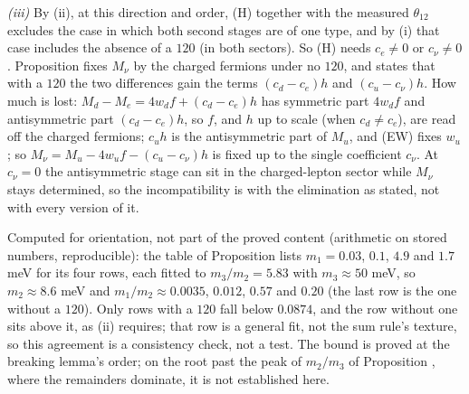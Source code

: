 \emph{(iii)} By (ii), at this direction and order, (H) together with the measured $\theta_{12}$ excludes the case in which both second stages are of one type, and by (i) that case includes the absence of a $120$ (in both sectors). So (H) needs $c_{e} \neq 0$ or $c_{\nu} \neq 0$. Proposition  fixes $M_{\nu}$ by the charged fermions under no $120$, and states that with a $120$ the two differences gain the terms $(c_{d} - c_{e})h$ and $(c_{u} - c_{\nu})h$. How much is lost: $M_{d} - M_{e} = 4w_{d}f + (c_{d} - c_{e})h$ has symmetric part $4w_{d}f$ and antisymmetric part $(c_{d} - c_{e})h$, so $f$, and $h$ up to scale (when $c_{d} \neq c_{e}$), are read off the charged fermions; $c_{u}h$ is the antisymmetric part of $M_{u}$, and (EW) fixes $w_{u}$; so $M_{\nu} = M_{u} - 4w_{u}f - (c_{u} - c_{\nu})h$ is fixed up to the single coefficient $c_{\nu}$. At $c_{\nu} = 0$ the antisymmetric stage can sit in the charged-lepton sector while $M_{\nu}$ stays determined, so the incompatibility is with the elimination as stated, not with every version of it.

Computed for orientation, not part of the proved content (arithmetic on stored numbers, reproducible): the table of Proposition  lists $m_{1} = 0.03$, $0.1$, $4.9$ and $1.7$ meV for its four rows, each fitted to $m_{3}/m_{2} = 5.83$ with $m_{3} \approx 50$ meV, so $m_{2} \approx 8.6$ meV and $m_{1}/m_{2} \approx 0.0035$, $0.012$, $0.57$ and $0.20$ (the last row is the one without a $120$). Only rows with a $120$ fall below $0.0874$, and the row without one sits above it, as (ii) requires; that row is a general fit, not the sum rule's texture, so this agreement is a consistency check, not a test. The bound is proved at the breaking lemma's order; on the root past the peak of $m_{2}/m_{3}$ of Proposition , where the remainders dominate, it is not established here.
